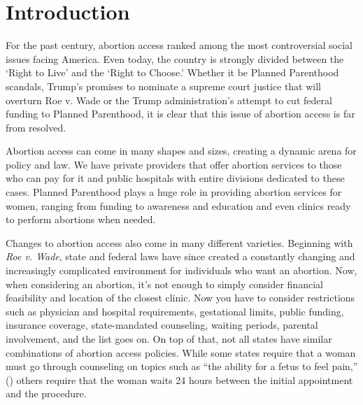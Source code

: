 \section{Introduction}
    For the past century, abortion access ranked among the most controversial social issues facing America. Even today, the country is strongly divided between the `Right to Live' and the `Right to Choose.' Whether it be Planned Parenthood scandals, Trump's promises to nominate a supreme court justice that will overturn Roe v. Wade or the Trump administration's attempt to cut federal funding to Planned Parenthood, it is clear that this issue of abortion access is far from resolved.

    Abortion access can come in many shapes and sizes, creating a dynamic arena for policy and law. We have private providers that offer abortion services to those who can pay for it and public hospitals with entire divisions dedicated to these cases. Planned Parenthood plays a huge role in providing abortion services for women, ranging from funding to awareness and education and even clinics ready to perform abortions when needed.

    Changes to abortion access also come in many different varieties. Beginning with \textit{Roe v. Wade}, state and federal laws have since created a constantly changing and increasingly complicated environment for individuals who want an abortion. Now, when considering an abortion, it's not enough to simply consider financial feasibility and location of the closest clinic. Now you have to consider restrictions such as physician and hospital requirements, gestational limits, public funding, insurance coverage, state-mandated counseling, waiting periods, parental involvement, and the list goes on. On top of that, not all states have similar combinations of abortion access policies. While some states require that a woman must go through counseling on topics such as ``the ability for a fetus to feel pain,'' (\cite{guttmacher_3}) others require that the woman waits 24 hours between the initial appointment and the procedure.


